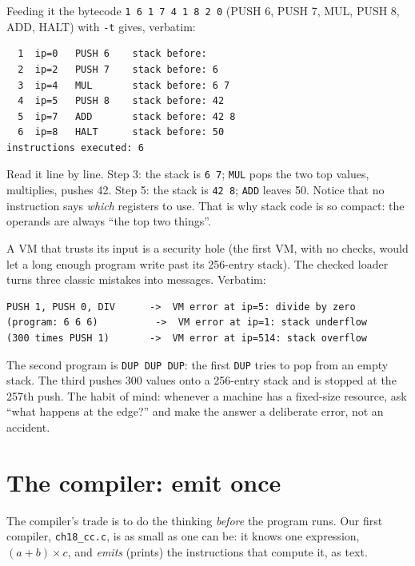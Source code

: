 \begin{example}
Feeding it the bytecode \texttt{1 6 1 7 4 1 8 2 0} (PUSH 6, PUSH 7,
MUL, PUSH 8, ADD, HALT) with \texttt{-t} gives, verbatim:
\begin{verbatim}
  1  ip=0   PUSH 6    stack before:
  2  ip=2   PUSH 7    stack before: 6
  3  ip=4   MUL       stack before: 6 7
  4  ip=5   PUSH 8    stack before: 42
  5  ip=7   ADD       stack before: 42 8
  6  ip=8   HALT      stack before: 50
instructions executed: 6
\end{verbatim}
Read it line by line. Step 3: the stack is \texttt{6 7}; \texttt{MUL}
pops the two top values, multiplies, pushes 42. Step 5: the stack is
\texttt{42 8}; \texttt{ADD} leaves 50. Notice that no instruction
says \emph{which} registers to use. That is why stack code is so
compact: the operands are always ``the top two things''.
\end{example}

\begin{example}
A VM that trusts its input is a security hole (the first VM, with
no checks, would let a long enough program write past
its 256-entry stack). The checked loader turns three classic
mistakes into messages. Verbatim:

{\scriptsize
\begin{verbatim}
PUSH 1, PUSH 0, DIV      ->  VM error at ip=5: divide by zero
(program: 6 6 6)          ->  VM error at ip=1: stack underflow
(300 times PUSH 1)       ->  VM error at ip=514: stack overflow
\end{verbatim}
}
The second program is \texttt{DUP DUP DUP}: the first \texttt{DUP}
tries to pop from an empty stack. The third pushes 300 values onto
a 256-entry stack and is stopped at the 257th push. The habit of mind: whenever a machine has a
fixed-size resource, ask ``what happens at the edge?'' and make the
answer a deliberate error, not an accident.
\end{example}

\section{The compiler: emit once}

The compiler's trade is to do the thinking \emph{before} the program runs. Our first
compiler, \texttt{ch18\_cc.c}, is as small as one can be: it
knows one expression, $(a+b)\times c$, and \emph{emits} (prints)
the instructions that compute it, as text.


